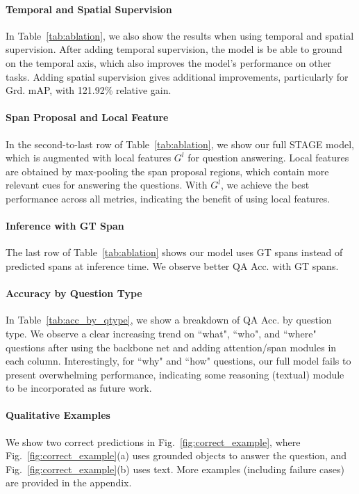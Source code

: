 \documentclass[11pt,a4paper]{article}
\begin{document}
\paragraph{Temporal and Spatial Supervision} 
In Table~\ref{tab:ablation}, we also show the results when using temporal and spatial supervision. After adding temporal supervision, the model is be able to ground on the temporal axis, which also improves the model's performance on other tasks. Adding spatial supervision gives additional improvements, particularly for Grd. mAP, with 121.92\% relative gain.


\paragraph{Span Proposal and Local Feature} 
In the second-to-last row of Table~\ref{tab:ablation}, we show our full STAGE model, which is augmented with local features $G^l$ for question answering. 
Local features are obtained by max-pooling the span proposal regions, which contain more relevant cues for answering the questions. 
With $G^l$, we achieve the best performance across all metrics, indicating the benefit of using local features. 

\paragraph{Inference with GT Span} 
The last row of Table~\ref{tab:ablation} shows our model uses GT spans instead of predicted spans at inference time. We observe better QA Acc. with GT spans.


\paragraph{Accuracy by Question Type} 
In Table~\ref{tab:acc_by_qtype}, we show a breakdown of QA Acc. by question type. 
We observe a clear increasing trend on ``what", ``who", and ``where" questions after using the backbone net and adding attention/span modules in each column.  
Interestingly, for ``why" and ``how" questions, our full model fails to present overwhelming performance, indicating some reasoning (textual) module to be incorporated as future work.

\paragraph{Qualitative Examples} 
We show two correct predictions in Fig.~\ref{fig:correct_example}, where Fig.~\ref{fig:correct_example}(a) uses grounded objects to answer the question, and Fig.~\ref{fig:correct_example}(b) uses text. More examples (including failure cases) are provided in the appendix.
\end{document}
